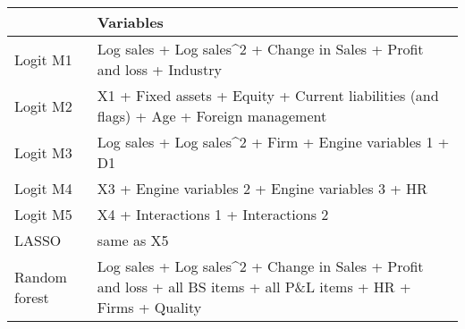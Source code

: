 
\begin{tabular}{ll}
\toprule
  & Variables\\
\midrule
Logit M1 & Log sales + Log sales\textasciicircum{}2 + Change in Sales + Profit and loss + Industry\\
Logit M2 & X1 + Fixed assets + Equity + Current liabilities (and flags) + Age + Foreign management\\
Logit M3 & Log sales + Log sales\textasciicircum{}2 + Firm + Engine variables 1 + D1\\
Logit M4 & X3 + Engine variables 2 + Engine variables 3 + HR\\
Logit M5 & X4 + Interactions 1 + Interactions 2\\
LASSO & same as X5\\
Random forest & Log sales + Log sales\textasciicircum{}2 + Change in Sales + Profit and loss + all BS items + all P\&L items + HR + Firms + Quality\\
\bottomrule
\end{tabular}